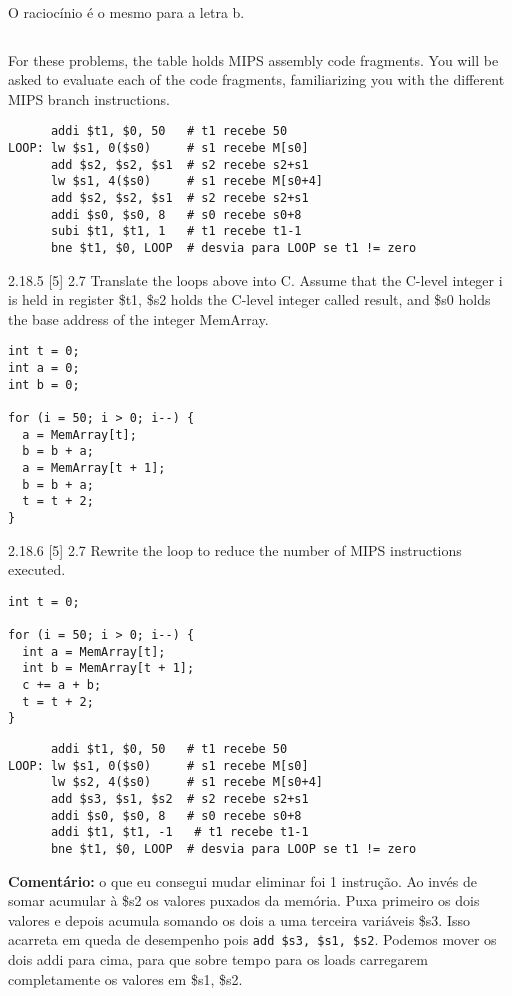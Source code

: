 \documentclass{article}
\begin{document}
O raciocínio é o mesmo para a letra b.

\begin{verbatim}

\end{verbatim}

For these problems, the table holds MIPS assembly code fragments. You will be
asked to evaluate each of the code fragments, familiarizing you with the
different MIPS branch instructions.

\begin{verbatim}
      addi $t1, $0, 50   # t1 recebe 50
LOOP: lw $s1, 0($s0)     # s1 recebe M[s0]
      add $s2, $s2, $s1  # s2 recebe s2+s1
      lw $s1, 4($s0)     # s1 recebe M[s0+4]
      add $s2, $s2, $s1  # s2 recebe s2+s1
      addi $s0, $s0, 8   # s0 recebe s0+8
      subi $t1, $t1, 1   # t1 recebe t1-1
      bne $t1, $0, LOOP  # desvia para LOOP se t1 != zero
\end{verbatim}

2.18.5 [5] 2.7 Translate the loops above into C. Assume that the C-level
integer i is held in register \$t1, \$s2 holds the C-level integer called
result, and \$s0 holds the base address of the integer MemArray.

\begin{verbatim}
int t = 0;
int a = 0;
int b = 0;

for (i = 50; i > 0; i--) {
  a = MemArray[t];
  b = b + a;
  a = MemArray[t + 1];
  b = b + a;
  t = t + 2;
}
\end{verbatim}

2.18.6  [5] 2.7 Rewrite the loop to reduce the number of MIPS instructions
executed.

\begin{verbatim}
int t = 0;

for (i = 50; i > 0; i--) {
  int a = MemArray[t];
  int b = MemArray[t + 1];
  c += a + b;
  t = t + 2;
}
\end{verbatim}

\begin{verbatim}
      addi $t1, $0, 50   # t1 recebe 50
LOOP: lw $s1, 0($s0)     # s1 recebe M[s0]
      lw $s2, 4($s0)     # s1 recebe M[s0+4]
      add $s3, $s1, $s2  # s2 recebe s2+s1
      addi $s0, $s0, 8   # s0 recebe s0+8
      addi $t1, $t1, -1   # t1 recebe t1-1
      bne $t1, $0, LOOP  # desvia para LOOP se t1 != zero
\end{verbatim}

\textbf{Comentário: } o que eu consegui mudar eliminar foi 1 instrução. Ao
invés de somar acumular à \$s2 os valores puxados da memória. Puxa primeiro os
dois valores e depois acumula somando os dois a uma terceira variáveis \$s3.
Isso acarreta em queda de desempenho pois \verb|add $s3, $s1, $s2|. Podemos
mover os dois addi para cima, para que sobre tempo para os loads carregarem
completamente os valores em \$s1, \$s2.
\end{document}
